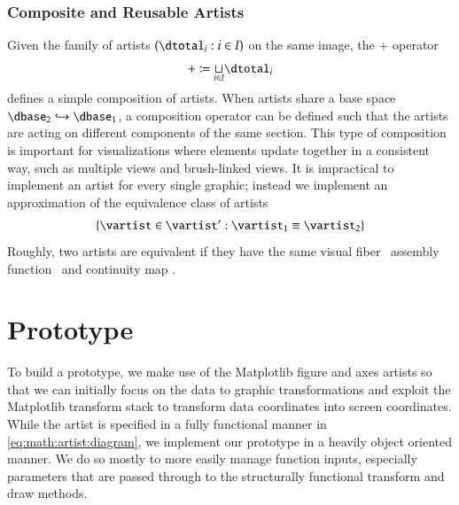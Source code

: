\documentclass[journal]{vgtc}                %
\begin{document}
\subsubsection{Composite and Reusable Artists}
Given the family of artists $(\dtotal_i: i\in I)$ on the same image, the + operator 
\begin{equation}
+ \coloneqq \underset{i\in I}{\sqcup} \dtotal_{i}
\end{equation}
defines a simple composition of artists. When artists share a base space $\dbase_2 \hookrightarrow \dbase_1$, a composition operator can be defined such that the artists are acting on different components of the same section. This type of composition is important for visualizations where elements update together in a consistent way, such as multiple views \cite{alboRadarComparativeEvaluation2016a, hullmanKeeping2018} and brush-linked views\cite{beckerBrushingScatterplots1987,bujaInteractiveData1991}. It is impractical to implement an artist for every single graphic; instead we implement an approximation of the equivalence class of artists 
\begin{equation}
\{\vartist \in \vartist^{\prime}: \vartist_{1} \equiv \vartist_{2}\}
\label{eq:math:artist:aprime}
\end{equation}
Roughly, two artists are equivalent if they have the same visual fiber \vfiber\, assembly function \vmark\, and continuity map \vindex. 

\section{Prototype}
\label{sec:code}
To build a prototype, we make use of the Matplotlib figure and axes artists \cite{hunterArchitectureOpenSource,hunterMatplotlib2DGraphics2007} so that we can initially focus on the data to graphic transformations and exploit the Matplotlib transform stack to transform data coordinates into screen coordinates. While the artist is specified in a fully functional manner in \autoref{eq:math:artist:diagram}, we implement our prototype in a heavily object oriented manner. We do so mostly to more easily manage function inputs, especially parameters that are passed through to the structurally functional transform and draw methods. 
\end{document}
